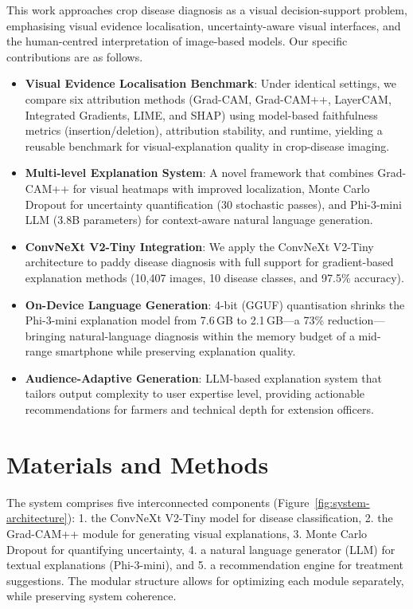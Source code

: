 \documentclass[pdflatex,sn-mathphys-num]{sn-jnl}%
\begin{document}
This work approaches crop disease diagnosis as a visual decision-support problem, emphasising visual evidence localisation, uncertainty-aware visual interfaces, and the human-centred interpretation of image-based models. Our specific contributions are as follows.
\begin{itemize}
    \item \textbf{Visual Evidence Localisation Benchmark}: Under identical settings, we compare six attribution methods (Grad-CAM, Grad-CAM++, LayerCAM, Integrated Gradients, LIME, and SHAP) using model-based faithfulness metrics (insertion/deletion), attribution stability, and runtime, yielding a reusable benchmark for visual-explanation quality in crop-disease imaging.

    \item \textbf{Multi-level Explanation System}: A novel framework that combines Grad-CAM++ for visual heatmaps with improved localization, Monte Carlo Dropout for uncertainty quantification (30 stochastic passes), and Phi-3-mini LLM (3.8B parameters) for context-aware natural language generation.

    \item \textbf{ConvNeXt V2-Tiny Integration}: We apply the ConvNeXt V2-Tiny architecture to paddy disease diagnosis with full support for gradient-based explanation methods (10,407 images, 10 disease classes, and 97.5\% accuracy).

    \item \textbf{On-Device Language Generation}: 4-bit (GGUF) quantisation shrinks the Phi-3-mini explanation model from 7.6\,GB to 2.1\,GB---a 73\% reduction---bringing natural-language diagnosis within the memory budget of a mid-range smartphone while preserving explanation quality.

    \item \textbf{Audience-Adaptive Generation}: LLM-based explanation system that tailors output complexity to user expertise level, providing actionable recommendations for farmers and technical depth for extension officers.
\end{itemize}

\section{Materials and Methods}\label{sec:methods}

The system comprises five interconnected components (Figure~\ref{fig:system-architecture}): 1. the ConvNeXt V2-Tiny model for disease classification, 2. the Grad-CAM++ module for generating visual explanations, 3. Monte Carlo Dropout for quantifying uncertainty, 4. a natural language generator (LLM) for textual explanations (Phi-3-mini), and 5. a recommendation engine for treatment suggestions. The modular structure allows for optimizing each module separately, while preserving system coherence.
\end{document}
